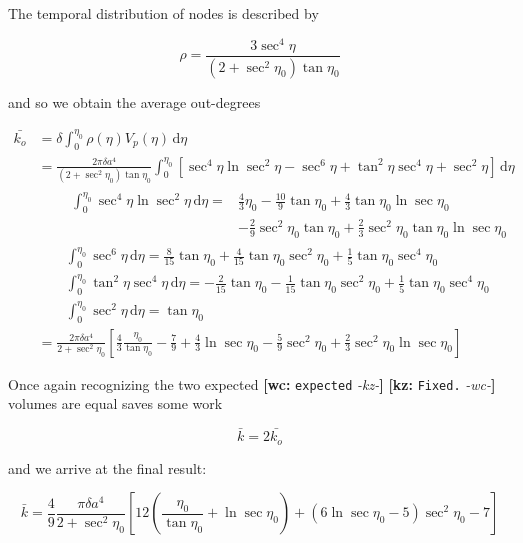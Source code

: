 \documentclass[preprint,notitlepage,amsmath,amssymb,floatfix]{revtex4-1}
\newcommand{\XXX}[3]{{\bf [#1: } {\tt #3} {\it -#2-}{\bf ]}}
\begin{document}
\noindent The temporal distribution of nodes is described by

\begin{equation}
\label{eq:rhoeta3}
\rho = \frac{3\sec^4\eta}{\left(2+\sec^2\eta_0\right)\tan\eta_0}
\end{equation}

\noindent and so we obtain the average out-degrees

\begin{align}
\bar{k_o} &= \delta\int_0^{\eta_0}\!\rho\left(\eta\right)V_p\left(\eta\right)\,\mathrm d\eta \\
  &= \frac{2\pi\delta a^4}{\left(2+\sec^2\eta_0\right)\tan\eta_0}\int_0^{\eta_0}\!\left[\sec^4\eta\ln\sec^2\eta - \sec^6\eta + \tan^2\eta\sec^4\eta+\sec^2\eta\right]\,\mathrm d\eta \\
  &\qquad\begin{aligned}
    \int_0^{\eta_0}\!\sec^4\eta\ln\sec^2\eta\,\mathrm d\eta = &\frac{4}{3}\eta_0 - \frac{10}{9}\tan\eta_0 + \frac{4}{3}\tan\eta_0\ln\sec\eta_0 \\
    &-\frac{2}{9}\sec^2\eta_0\tan\eta_0 + \frac{2}{3}\sec^2\eta_0\tan\eta_0\ln\sec\eta_0
  \end{aligned} \\
  &\qquad\int_0^{\eta_0}\!\sec^6\eta\,\mathrm d\eta = \frac{8}{15}\tan\eta_0 + \frac{4}{15}\tan\eta_0\sec^2\eta_0 + \frac{1}{5}\tan\eta_0\sec^4\eta_0 \\
  &\qquad\int_0^{\eta_0}\!\tan^2\eta\sec^4\eta\,\mathrm d\eta = -\frac{2}{15}\tan\eta_0 - \frac{1}{15}\tan\eta_0\sec^2\eta_0 + \frac{1}{5}\tan\eta_0\sec^4\eta_0 \\
  &\qquad\int_0^{\eta_0}\!\sec^2\eta\,\mathrm d\eta = \tan\eta_0 \\
  &=\frac{2\pi\delta a^4}{2+\sec^2\eta_0}\left[\frac{4}{3}\frac{\eta_0}{\tan\eta_0} - \frac{7}{9} + \frac{4}{3}\ln\sec\eta_0 - \frac{5}{9}\sec^2\eta_0 + \frac{2}{3}\sec^2\eta_0\ln\sec\eta_0\right]
\end{align}

\noindent Once again recognizing the two expected \XXX{wc}{kz}{expected} \XXX{kz}{wc}{Fixed.} volumes are equal saves some work

\begin{equation}
\bar{k} = 2\bar{k_o}
\end{equation}

\noindent and we arrive at the final result:

\begin{equation}
\label{eq:finalk3}
\bar k = \frac{4}{9}\frac{\pi\delta a^4}{2+\sec^2\eta_0}\left[12\left(\frac{\eta_0}{\tan\eta_0}+\ln\sec\eta_0\right)+\left(6\ln\sec\eta_0-5\right)\sec^2\eta_0-7\right]
\end{equation}
\end{document}
